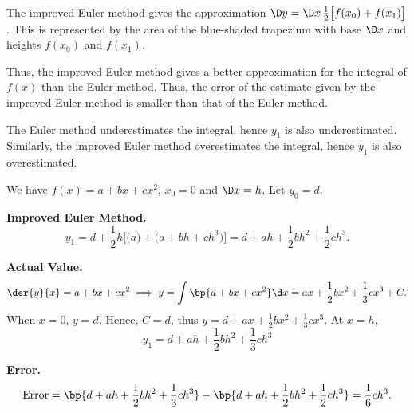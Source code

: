 \begin{solution}
\begin{ppart}
        The improved Euler method gives the approximation $\D y = \D x \, \frac12 \big[f(x_0) + f(x_1)\big]$. This is represented by the area of the blue-shaded trapezium with base $\D x$ and heights $f(x_0)$ and $f(x_1)$.

        Thus, the improved Euler method gives a better approximation for the integral of $f(x)$ than the Euler method. Thus, the error of the estimate given by the improved Euler method is smaller than that of the Euler method.

        The Euler method underestimates the integral, hence $y_1$ is also underestimated. Similarly, the improved Euler method overestimates the integral, hence $y_1$ is also overestimated.
    \end{ppart}
    \begin{ppart}
        We have $f(x) = a + bx + cx^2$, $x_0 = 0$ and $\D x = h$. Let $y_0 = d$.

        \textbf{Improved Euler Method.} \[y_1 = d + \frac12 h \Big[\big(a\big) + \big( a + bh + ch^3\big)\Big] = d + ah + \frac12 bh^2 + \frac12 ch^3.\]

        \textbf{Actual Value.}
        \[\der{y}{x} = a + bx + cx^2 \implies y = \int \bp{a + bx + cx^2} \d x = ax + \frac12 bx^2 + \frac13 cx^3 + C.\]
        When $x = 0$, $y = d$. Hence, $C = d$, thus $y = d + ax + \frac12 bx^2 + \frac13 cx^3$. At $x = h$, \[y_1 = d + ah + \frac12 bh^2 + \frac13 ch^3\]
        
        \textbf{Error.} \[\text{Error} = \bp{d + ah + \frac12 bh^2 + \frac13 ch^3} - \bp{d + ah + \frac12 bh^2 + \frac12 ch^3} = \frac16 ch^3.\]
    \end{ppart}
\end{solution}

